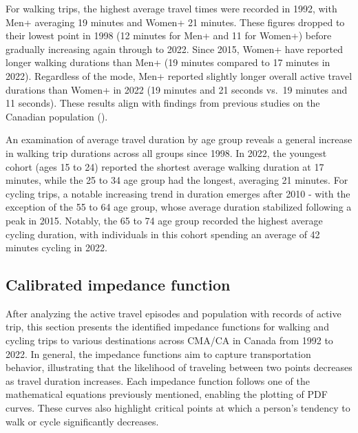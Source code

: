 \documentclass[preprint, 3p,
authoryear]{elsarticle} %
\begin{document}
For walking trips, the highest average travel times were recorded in
1992, with Men+ averaging 19 minutes and Women+ 21 minutes. These
figures dropped to their lowest point in 1998 (12 minutes for Men+ and
11 for Women+) before gradually increasing again through to 2022. Since
2015, Women+ have reported longer walking durations than Men+ (19
minutes compared to 17 minutes in 2022). Regardless of the mode, Men+
reported slightly longer overall active travel durations than Women+ in
2022 (19 minutes and 21 seconds vs.~19 minutes and 11 seconds). These
results align with findings from previous studies on the Canadian
population (\citep{bryan2009patterns, borhani2024}).

An examination of average travel duration by age group reveals a general
increase in walking trip durations across all groups since 1998. In
2022, the youngest cohort (ages 15 to 24) reported the shortest average
walking duration at 17 minutes, while the 25 to 34 age group had the
longest, averaging 21 minutes. For cycling trips, a notable increasing
trend in duration emerges after 2010 - with the exception of the 55 to
64 age group, whose average duration stabilized following a peak in
2015. Notably, the 65 to 74 age group recorded the highest average
cycling duration, with individuals in this cohort spending an average of
42 minutes cycling in 2022.

\subsection{Calibrated impedance
function}\label{calibrated-impedance-function}

After analyzing the active travel episodes and population with records
of active trip, this section presents the identified impedance functions
for walking and cycling trips to various destinations across CMA/CA in
Canada from 1992 to 2022. In general, the impedance functions aim to
capture transportation behavior, illustrating that the likelihood of
traveling between two points decreases as travel duration increases.
Each impedance function follows one of the mathematical equations
previously mentioned, enabling the plotting of PDF curves. These curves
also highlight critical points at which a person's tendency to walk or
cycle significantly decreases.
\end{document}
